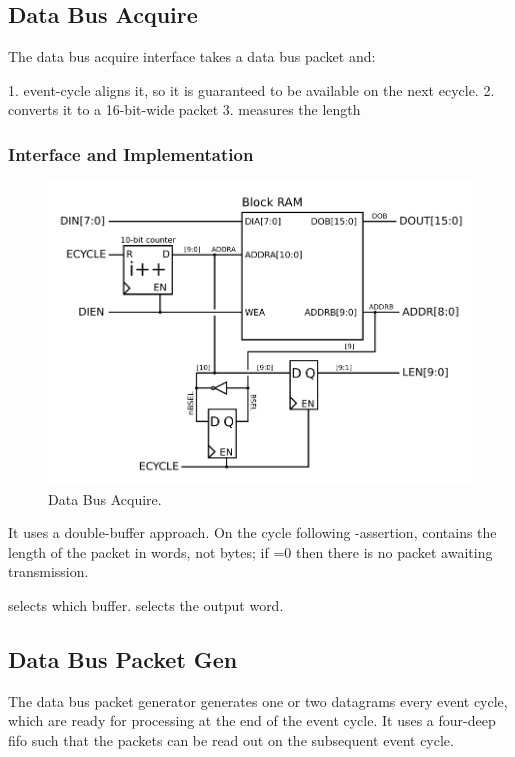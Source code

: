 \subsection{Data Bus Acquire}
The data bus acquire interface takes a data bus packet and: 

1. event-cycle aligns it, so it is guaranteed to be available on the
   next ecycle.
2. converts it to a 16-bit-wide packet
3. measures the length

\subsubsection{Interface and Implementation} 
 \begin{figure}
\begin{centering}
\includegraphics[scale=0.8]{data.acquire.svg}
\end{centering}
\caption{Data Bus Acquire.}
\label{data.acquire}
\end{figure}

It uses a double-buffer approach. On the cycle following
-assertion,  contains the length of
the packet in words, not bytes; if  =0 then there is
no packet awaiting transmission.

 selects which buffer.  selects the
output word.

\subsection{Data Bus Packet Gen}
The data bus packet generator generates one or two datagrams every
event cycle, which are ready for processing at the end of the event
cycle. It uses a four-deep fifo such that the packets can be read out
on the subsequent event cycle.

